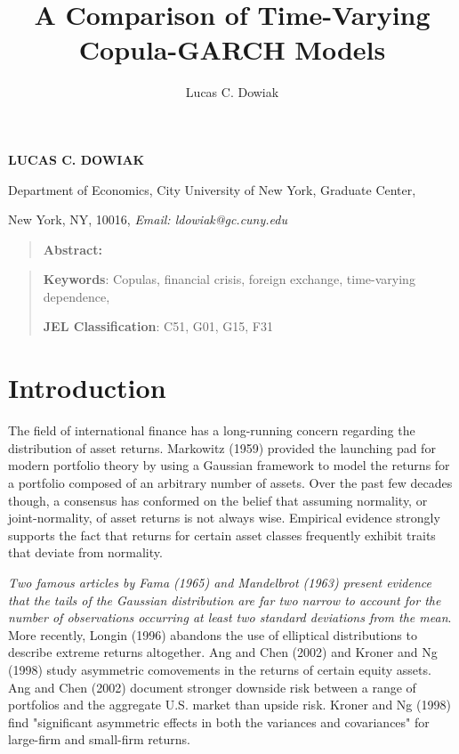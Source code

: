 \documentclass[12pt]{article}
\title{A Comparison of Time-Varying Copula-GARCH Models}
\author{Lucas C. Dowiak}
\begin{document}
 
\maketitle{}
 

\textbf{LUCAS C. DOWIAK\medskip}

Department of Economics, City University of New York\smallskip, Graduate
Center,

New York, NY, 10016, \textit{Email: ldowiak@gc.cuny.edu}

\qquad

\begin{quotation}
\textbf{Abstract:}
\end{quotation}

\vspace{1pt}

\begin{quotation}
\textbf{Keywords}: Copulas, financial crisis, foreign exchange, time-varying
dependence,

\textbf{JEL Classification}: C51, G01, G15, F31
\end{quotation}

\vspace{1pt}

\section{Introduction}

The field of international finance has a long-running concern regarding the distribution of asset returns. Markowitz (1959) provided the launching pad for modern portfolio theory by using a Gaussian framework to model the returns for a portfolio composed of an arbitrary number of assets. Over the past few decades though, a consensus has conformed on the belief that assuming normality, or joint-normality, of asset returns is not always wise. Empirical evidence strongly supports the fact that returns for certain asset classes frequently exhibit traits that deviate from normality.

\emph{Two famous articles by Fama (1965) and Mandelbrot (1963) present evidence that the tails of the Gaussian distribution are far two narrow to account for the number of observations occurring at least two standard deviations from the mean}. More recently, Longin (1996) abandons the use of elliptical distributions to describe extreme returns altogether. Ang and Chen (2002) and Kroner and Ng (1998) study asymmetric comovements in the returns of certain equity assets. Ang and Chen (2002) document stronger downside risk between a range of portfolios and the aggregate U.S. market than upside risk. Kroner and Ng (1998) find "significant asymmetric effects in both the variances and covariances" for large-firm and small-firm returns.
\end{document}
